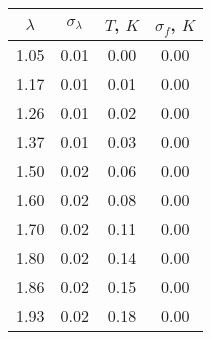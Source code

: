 \begin{tabular}{cc|cc}
\toprule
$\lambda$ & $\sigma_{\lambda}$ & $T$, $K$ & $\sigma_{f}$, $K$ \\
\midrule
1.05 & 0.01 & 0.00 & 0.00 \\
1.17 & 0.01 & 0.01 & 0.00 \\
1.26 & 0.01 & 0.02 & 0.00 \\
1.37 & 0.01 & 0.03 & 0.00 \\
1.50 & 0.02 & 0.06 & 0.00 \\
1.60 & 0.02 & 0.08 & 0.00 \\
1.70 & 0.02 & 0.11 & 0.00 \\
1.80 & 0.02 & 0.14 & 0.00 \\
1.86 & 0.02 & 0.15 & 0.00 \\
1.93 & 0.02 & 0.18 & 0.00 \\
\bottomrule
\end{tabular}
